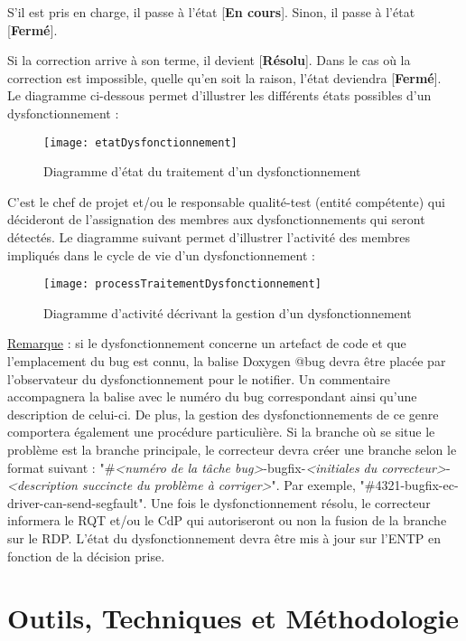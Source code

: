 \documentclass[a4paper,11pt,titlepage]{article}
\begin{document}
S'il est pris en charge, il passe à l'état [\textbf{En cours}]. Sinon, il passe à l'état [\textbf{Fermé}]. 

Si la correction arrive à son terme, il devient [\textbf{Résolu}].
Dans le cas où la correction est impossible, quelle qu'en soit la raison, l'état deviendra [\textbf{Fermé}].\\

Le diagramme ci-dessous permet d'illustrer les différents états possibles d'un dysfonctionnement :
\begin{figure} [H]
    \centering
    \texttt{[image: etatDysfonctionnement]}
    \caption{Diagramme d'état du traitement d'un dysfonctionnement}
\end{figure}

C'est le chef de projet et/ou le responsable qualité-test (entité compétente) qui décideront de l'assignation des membres aux dysfonctionnements qui seront détectés. Le diagramme suivant permet d'illustrer l'activité des membres impliqués dans le cycle de vie d'un dysfonctionnement :
\begin{figure} [H]
    \centering
    \texttt{[image: processTraitementDysfonctionnement]}
    \caption{Diagramme d'activité décrivant la gestion d'un dysfonctionnement}
\end{figure}

\underline{Remarque} : si le dysfonctionnement concerne un artefact de code et que l'emplacement du bug est connu,
la balise Doxygen @bug devra être placée par l'observateur du dysfonctionnement pour le notifier. Un commentaire accompagnera la balise 
avec le numéro du bug correspondant ainsi qu'une description de celui-ci. De plus, la gestion des dysfonctionnements de ce genre 
comportera également une procédure particulière. Si la branche où se situe le problème est la branche principale, le correcteur devra
créer une branche selon le format suivant : "\#\emph{<numéro de la tâche bug>}-bugfix-\emph{<initiales du correcteur>}-\emph{<description succincte du problème à corriger>}". Par exemple, "\#4321-bugfix-ec-driver-can-send-segfault".
Une fois le dysfonctionnement résolu, le correcteur informera le RQT et/ou le CdP qui autoriseront ou non la fusion de la branche sur 
le RDP. L'état du dysfonctionnement devra être mis à jour sur l'ENTP en fonction de la décision prise.

\section{Outils, Techniques et Méthodologie}
\end{document}
